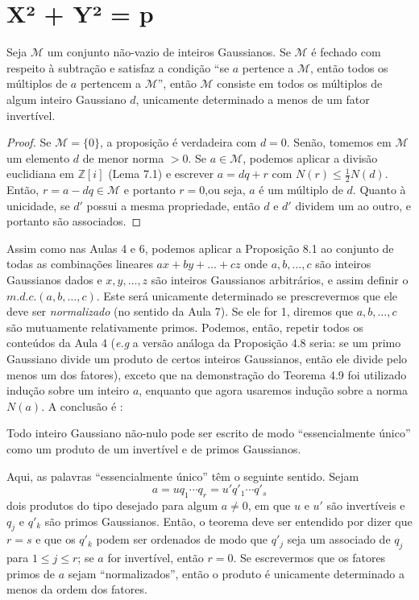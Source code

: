 \section{X² + Y² = p}

\begin{proposicao}
Seja $\mathcal{M}$ um conjunto não-vazio de inteiros Gaussianos. Se $\mathcal{M}$ é fechado com respeito à subtração
e satisfaz a condição ``se $a$ pertence a $\mathcal{M}$, então todos os múltiplos de $a$ pertencem a $\mathcal{M}$'',   
então $\mathcal{M}$ consiste em todos os múltiplos de algum inteiro Gaussiano $d$, unicamente determinado a menos de um 
fator invertível.
\end{proposicao}

\begin{proof}
Se $\mathcal{M}=\{0\}$, a proposição é verdadeira com $d=0$.  
Senão, tomemos em $\mathcal{M}$ um elemento $d$ de menor norma $>0$.  
Se $a \in \mathcal{M}$, podemos aplicar a divisão euclidiana em $\mathbb{Z}[i]$ (Lema 7.1)
e escrever $a = dq + r$ com $N(r) \leq \tfrac{1}{2}N(d)$.  
Então, $r = a - dq \in \mathcal{M}$ e portanto $r=0$,ou seja, $a$ é um múltiplo de $d$.
Quanto à unicidade, se $d'$ possui a mesma propriedade, então $d$ e $d'$ dividem um ao outro, 
e portanto são associados.  
\end{proof}

Assim como nas Aulas 4 e 6, podemos aplicar a Proposição 8.1 ao conjunto de todas as combinações lineares
$ax + by + \ldots + cz$ onde $a,b, \ldots, c$ são inteiros Gaussianos dados e $x,y, \ldots, z$ são inteiros 
Gaussianos arbitrários, e assim definir o $m.d.c. (a,b, \ldots, c)$. Este será unicamente determinado se 
prescrevermos que ele deve ser \emph{normalizado} (no sentido da Aula 7). Se ele for 1, diremos que 
$a,b, \ldots, c$ são mutuamente relativamente primos. Podemos, então, repetir todos os conteúdos da Aula 4 
(\emph{e.g} a versão análoga da Proposição 4.8 seria: se um primo Gaussiano divide um produto de certos inteiros
Gaussianos, então ele divide pelo menos um dos fatores), exceto que na demonstração do Teorema 4.9 foi utilizado 
indução sobre um inteiro $a$, enquanto que agora usaremos indução sobre a norma $N(a)$. A conclusão é :

\begin{proposicao}
Todo inteiro Gaussiano não-nulo pode ser escrito de modo
``essencialmente único'' como um produto de um invertível e de primos
Gaussianos.
\end{proposicao}

Aqui, as palavras ``essencialmente único'' têm o seguinte sentido.
Sejam
\[
a = u q_1 \cdots q_r = u' q'_1 \cdots q'_s
\]
dois produtos do tipo desejado para algum $a \neq 0$, em que $u$ e $u'$
são invertíveis e $q_j$ e $q'_k$ são primos Gaussianos. Então, o teorema
deve ser entendido por dizer que $r = s$ e que os $q'_k$ podem ser
ordenados de modo que $q'_j$ seja um associado de $q_j$ para
$1 \le j \le r$; se $a$ for invertível, então $r = 0$.
Se escrevermos que os fatores primos de $a$ sejam ``normalizados'',
então o produto é unicamente determinado a menos da ordem dos fatores.

